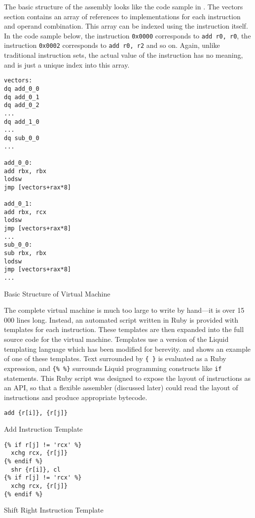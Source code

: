 		The basic structure of the assembly looks like the code sample in . The vectors section contains an array of references to implementations for each instruction and operand combination. This array can be indexed using the instruction itself. In the code sample below, the instruction \texttt{0x0000} corresponds to \texttt{add r0, r0}, the instruction \texttt{0x0002} corresponds to \texttt{add r0, r2} and so on. Again, unlike traditional instruction sets, the actual value of the instruction has no meaning, and is just a unique index into this array.
		
		\begin{myfigure}
			\begin{lstlisting}
vectors:
dq add_0_0
dq add_0_1
dq add_0_2
...
dq add_1_0
...
dq sub_0_0
...

add_0_0:
add rbx, rbx
lodsw
jmp [vectors+rax*8]

add_0_1:
add rbx, rcx
lodsw
jmp [vectors+rax*8]
...
sub_0_0:
sub rbx, rbx
lodsw
jmp [vectors+rax*8]
...
			\end{lstlisting}
			\caption{Basic Structure of Virtual Machine}
			\label{fig:vmstructure}
		\end{myfigure}
		
		The complete virtual machine is much too large to write by hand---it is over 15 000 lines long. Instead, an automated script written in Ruby is provided with templates for each instruction. These templates are then expanded into the full source code for the virtual machine. Templates use a version of the Liquid templating language which has been modified for berevity.  and  shows an example of one of these templates. Text surrounded by \texttt{\{ \}} is evaluated as a Ruby expression, and \texttt{\{\% \%\}} surrounds Liquid programming constructs like \texttt{if} statements. This Ruby script was designed to expose the layout of instructions as an API, so that a flexible assembler (discussed later) could read the layout of instructions and produce appropriate bytecode.
		
		\begin{doublefig}
			\begin{halffig}
				\begin{lstlisting}
add {r[i]}, {r[j]}
				\end{lstlisting}
				\caption{Add Instruction Template}
				\label{fig:addtemplate}
			\end{halffig}
			\begin{halffig}
				\begin{lstlisting}
{% if r[j] != 'rcx' %}
  xchg rcx, {r[j]}
{% endif %}
  shr {r[i]}, cl
{% if r[j] != 'rcx' %}
  xchg rcx, {r[j]}
{% endif %}
				\end{lstlisting}
				\caption{Shift Right Instruction Template}
				\label{fig:shrtemplate}
			\end{halffig}
		\end{doublefig}
		
